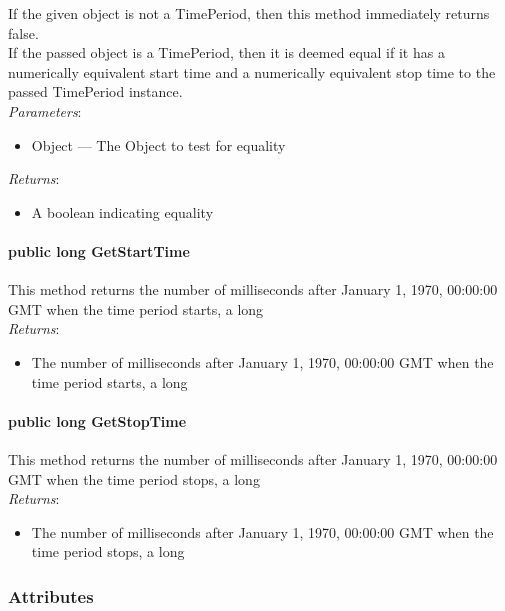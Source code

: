 \documentclass[$Date: 2003/06/26 19:29:31 $]{glabarticle}
\begin{document}
 If the given object is not a TimePeriod, then this method immediately  returns false. \\
 
 If the passed object is a TimePeriod, then it is deemed equal if it has a numerically equivalent 
 start time and a numerically equivalent stop time to the passed TimePeriod instance. \\
 
\textit{Parameters}:
\begin{itemize}
\item[] Object --- The Object to test for equality 
\end{itemize}

\textit{Returns}:
\begin{itemize}
\item[] A boolean indicating equality
\end{itemize}

\paragraph{public long GetStartTime}

This method returns the number of milliseconds after January 1, 1970, 00:00:00 GMT when the 
time period starts, a long \\

\textit{Returns}:
\begin{itemize}
\item[] The number of milliseconds after January 1, 1970, 00:00:00 GMT when the time period starts, a long
\end{itemize}

\paragraph{public long GetStopTime}

This method returns the number of milliseconds after January 1, 1970, 00:00:00 GMT when the 
time period stops, a long \\

\textit{Returns}:
\begin{itemize}
\item[] The number of milliseconds after January 1, 1970, 00:00:00 GMT when the time period stops, a long
\end{itemize}


\subsubsection{Attributes}
\end{document}
